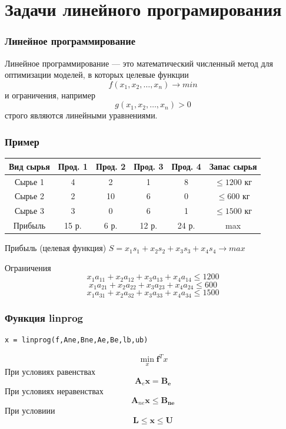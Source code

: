 \documentclass[11pt, compress]{beamer}
\begin{document}
\section{Задачи линейного програмирования}

\begin{frame}[c]\frametitle{Линейное программирование}
Линейное программирование — это математический численный метод для оптимизации моделей, в которых целевые функции 
$$
    f(x_1,x_2,\ldots,x_n) \rightarrow min
$$
и ограничения, например
$$
    g(x_1,x_2,\ldots,x_n) > 0
$$
строго являются линейными уравнениями.
\end{frame}

\begin{frame}[c]\frametitle{Пример}

\begin{tabular}{c|c|c|c|c|c}
Вид сырья & Прод. 1 & Прод. 2 & Прод. 3 & Прод. 4 & Запас сырья \\
\hline
Сырье 1 & 4 & 2 & 1 & 8 & $\leq1200$ кг \\
Сырье 2 & 2 & 10 & 6 & 0 & $\leq600$ кг \\
Сырье 3 & 3 & 0 & 6 & 1 & $\leq1500$ кг \\
\hline
Прибыль & 15 р. & 6 р. & 12 р. & 24 р. & max \\
\end{tabular}
\vfill
Прибыль (целевая функция) $S = x_1 s_1 + x_2 s_2 + x_3 s_3 + x_4 s_4 \rightarrow max$

Ограничения
$$
	x_1 a_{11} + x_2 a_{12} + x_3 a_{13} + x_4 a_{14} \leq 1200
$$
$$
    x_1 a_{21} + x_2 a_{22} + x_3 a_{23} + x_4 a_{24} \leq 600
$$
$$
	x_1 a_{31} + x_2 a_{32} + x_3 a_{33} + x_4 a_{34} \leq 1500
$$
\end{frame}

\begin{frame}[c, fragile]\frametitle{Функция linprog}
\begin{lstlisting}
x = linprog(f,Ane,Bne,Ae,Be,lb,ub)
\end{lstlisting}
$$
\min_{x} \boldsymbol{f}^T x 
$$
При условиях равенствах
$$
	\boldsymbol{A}_e \boldsymbol{x} = \boldsymbol{B_e}
$$
При условиях неравенствах
$$
	\boldsymbol{A}_{ne} \boldsymbol{x} \leq \boldsymbol{B_{ne}}
$$
При условиии
$$
	\boldsymbol{L} \leq \boldsymbol{x} \leq \boldsymbol{U}
$$
\end{frame}
\end{document}
